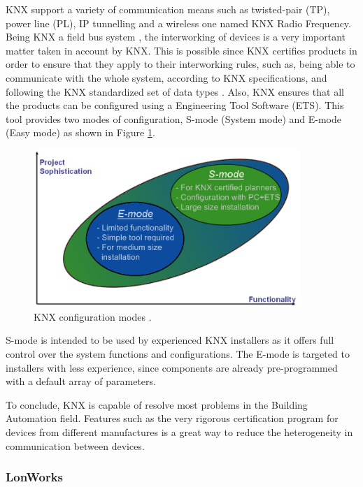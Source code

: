 KNX support a variety of communication means such as twisted-pair (TP), power line (PL), IP tunnelling and a wireless one named KNX
Radio Frequency. Being KNX a field bus system \cite{Osorio}, the interworking of devices is a very important matter taken in account by KNX. This is possible since KNX certifies products in order to ensure that they apply to their interworking rules, such as, being able to communicate with the whole system, according to KNX specifications, and following the KNX standardized set of data types \cite{Interworking_KNX}. Also, KNX ensures that all the products can be configured using a Engineering Tool Software (ETS). This tool provides two modes of configuration, S-mode (System mode) and E-mode (Easy mode) as shown in Figure \ref{fig:knx_modes}. 

\begin{figure}[H]
	\centering
	\includegraphics[width=0.9\textwidth]{figures/knxmodes.png}
	\caption{KNX configuration modes \cite{knx}. }
	\label{fig:knx_modes}
\end{figure}
 
 S-mode is intended to be used by experienced KNX installers as it offers full control over the system functions and configurations. The E-mode is targeted to installers with less experience, since components are already pre-programmed with a default array of parameters.
 
To conclude, KNX is capable of resolve most problems in the Building Automation field. Features such as the very rigorous certification program for devices from different manufactures is a great way to reduce the heterogeneity in communication between devices.

 
\subsubsection{LonWorks}

